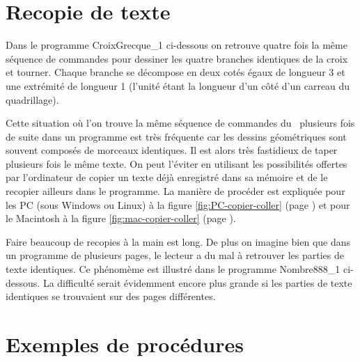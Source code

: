 \section{Recopie de texte} 

Dans le programme {\idt CroixGrecque\_1} ci-dessous on retrouve quatre fois la même
séquence de commandes pour dessiner les quatre
bran\-ches identiques de la croix et tourner. Chaque branche se décompose en deux cotés égaux
de lon\-gueur 3 et une extrémité de lon\-gueur 1 (l'unité
étant la longueur d'un côté d'un carreau  du quadrillage).

\vspace{\baselineskip}
\vspace*{3cm}%
\vspace*{-3cm}%
\label{prog:CroixGrecque_1}


Cette situation où l'on trouve la même séquence de commandes du \robot\ 
plusieurs fois de suite dans un programme est très fréquente car les 
dessins géométriques sont souvent composés de morceaux identiques. Il est alors
très fastidieux de taper plusieurs fois le même texte. On peut l'éviter
en utilisant les possibilités offertes par l'ordinateur de copier un texte
déjà enregistré dans sa mémoire et de le recopier ailleurs dans le 
programme. La manière de procéder est expliquée pour les 
PC (sous Windows ou Linux) à la figure \ref{fig:PC-copier-coller} 
(page \pageref{fig:PC-copier-coller})
et pour le Macintosh à la figure \ref{fig:mac-copier-coller} 
(page \pageref{fig:mac-copier-coller}).



Faire beaucoup de recopies à la main est long. De plus on imagine bien que 
dans un programme de plusieurs pages, le lecteur a du mal à retrouver les 
parties de texte identiques. Ce phénomème est illustré dans le
programme {\idt Nombre888\_1} ci-dessous. La difficulté serait
évidemment encore plus grande si les parties de texte identiques se
trouvaient sur des pages différentes.

\vspace{\baselineskip}
\vspace*{2cm}%
\vspace*{-2cm}%


\section{Exemples de procédures} 

